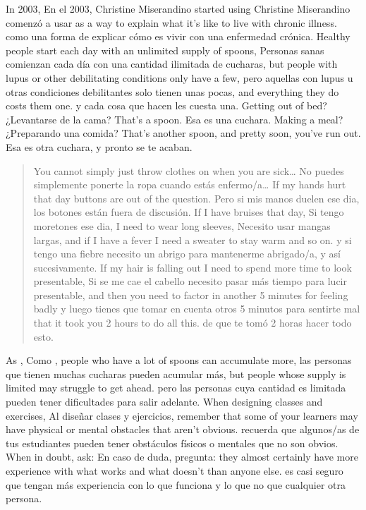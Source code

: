 In 2003,
En el 2003,
Christine Miserandino started using 
Christine Miserandino comenzó a usar 
as a way to explain what it's like to live with chronic illness.
como una forma de explicar cómo es vivir con una enfermedad crónica.
Healthy people start each day with an unlimited supply of spoons,
Personas sanas comienzan cada día con una cantidad ilimitada de cucharas,
but people with lupus or other debilitating conditions only have a few,
pero aquellas con lupus u otras condiciones debilitantes solo tienen unas pocas,
and everything they do costs them one.
y cada cosa que hacen les cuesta una.
Getting out of bed?
¿Levantarse de la cama?
That's a spoon.
Esa es una cuchara.
Making a meal?
¿Preparando una comida?
That's another spoon, and pretty soon, you've run out.
Esa es otra cuchara, y pronto se te acaban.

\begin{quote}

  You cannot simply just throw clothes on when you are sick{\ldots}
  No puedes simplemente ponerte la ropa cuando estás enfermo/a{\dots}
  If my hands hurt that day buttons are out of the question.
  Pero si mis manos duelen ese dia, los botones están fuera de discusión.
  If I have bruises that day,
  Si tengo moretones ese dia,
  I need to wear long sleeves,
  Necesito usar mangas largas,
  and if I have a fever I need a sweater to stay warm and so on.
  y si tengo una fiebre necesito un abrigo para mantenerme abrigado/a, y así sucesivamente.
  If my hair is falling out I need to spend more time to look presentable,
  Si se me cae el cabello necesito pasar más tiempo para lucir presentable,
  and then you need to factor in another 5 minutes for feeling badly
  y luego tienes que tomar en cuenta otros 5 minutos para sentirte mal
  that it took you 2 hours to do all this.
  de que te tomó 2 horas hacer todo esto.

\end{quote}

As ,
Como ,
people who have a lot of spoons can accumulate more,
las personas que tienen muchas cucharas pueden acumular más,
but people whose supply is limited may struggle to get ahead.
pero las personas cuya cantidad es limitada pueden tener dificultades para salir adelante.
When designing classes and exercises,
Al diseñar clases y ejercicios,
remember that some of your learners may have physical or mental obstacles that aren't obvious.
recuerda que algunos/as de tus estudiantes pueden tener obstáculos físicos o mentales que no son obvios.
When in doubt, ask:
En caso de duda, pregunta:
they almost certainly have more experience with what works and what doesn't than anyone else.
es casi seguro que tengan más experiencia con lo que funciona y lo que no que cualquier otra persona.

